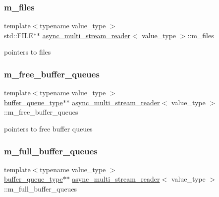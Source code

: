 \subsubsection{\texorpdfstring{m\+\_\+files}{m\_files}}
{\footnotesize\ttfamily template$<$typename value\+\_\+type $>$ \\
std\+::\+F\+I\+LE$\ast$$\ast$ \hyperlink{classasync__multi__stream__reader}{async\+\_\+multi\+\_\+stream\+\_\+reader}$<$ value\+\_\+type $>$\+::m\+\_\+files\hspace{0.3cm}{\ttfamily [private]}}



pointers to files 

\mbox{\label{classasync__multi__stream__reader_a955fea161fa853f416b372699af70b15}} 
\subsubsection{\texorpdfstring{m\+\_\+free\+\_\+buffer\+\_\+queues}{m\_free\_buffer\_queues}}
{\footnotesize\ttfamily template$<$typename value\+\_\+type $>$ \\
\hyperlink{classasync__multi__stream__reader_a0bf4b801f7d874da5cbbe5c6504d0ecc}{buffer\+\_\+queue\+\_\+type}$\ast$$\ast$ \hyperlink{classasync__multi__stream__reader}{async\+\_\+multi\+\_\+stream\+\_\+reader}$<$ value\+\_\+type $>$\+::m\+\_\+free\+\_\+buffer\+\_\+queues\hspace{0.3cm}{\ttfamily [private]}}



pointers to free buffer queues 

\mbox{\label{classasync__multi__stream__reader_a57291593ed44d4c1d2586a438bb4d0d6}} 
\subsubsection{\texorpdfstring{m\+\_\+full\+\_\+buffer\+\_\+queues}{m\_full\_buffer\_queues}}
{\footnotesize\ttfamily template$<$typename value\+\_\+type $>$ \\
\hyperlink{classasync__multi__stream__reader_a0bf4b801f7d874da5cbbe5c6504d0ecc}{buffer\+\_\+queue\+\_\+type}$\ast$$\ast$ \hyperlink{classasync__multi__stream__reader}{async\+\_\+multi\+\_\+stream\+\_\+reader}$<$ value\+\_\+type $>$\+::m\+\_\+full\+\_\+buffer\+\_\+queues\hspace{0.3cm}{\ttfamily [private]}}



